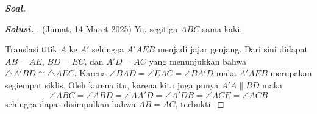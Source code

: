 \textbf{\textit{Soal.}} 

\begin{proof}[\textbf{Solusi. }] (Jumat, 14 Maret 2025) 
Ya, segitiga $ABC$ sama kaki.
%  

Translasi titik $A$ ke $A'$ sehingga $A'AEB$ menjadi jajar genjang. Dari sini didapat $AB=AE$, $BD=EC$, dan $A'D=AC$ yang menunjukkan bahwa $\triangle A'BD \cong \triangle AEC$.
Karena $\angle BAD = \angle EAC = \angle BA'D$ maka $A'AEB$ merupakan segiempat siklis. Oleh karena itu, karena kita juga punya $A'A \parallel BD$ maka
$$\angle ABC = \angle ABD = \angle AA'D = \angle A'DB = \angle ACE = \angle ACB$$
sehingga dapat disimpulkan bahwa $AB=AC$, terbukti.
\end{proof} 